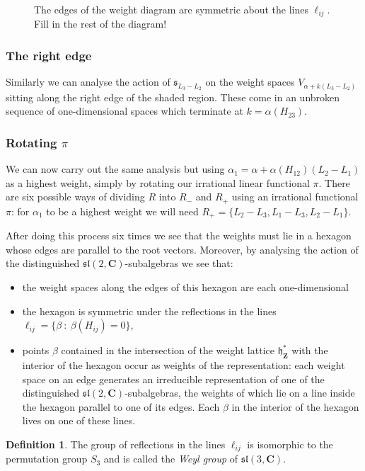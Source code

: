 \documentclass[12pt]{article}
\newcommand{\CC}{\mathbf{C}}
\newcommand{\ZZ}{\mathbf{Z}}
\theoremstyle{definition}
\newtheorem{dfn}[thm]{Definition}
\theoremstyle{check}
\theoremstyle{remark}
\theoremstyle{TheoremNum}
\begin{document}
\begin{figure}
\slhex
\caption{The edges of the weight diagram are symmetric about the lines $\ell_{ij}$. Fill in the rest of the diagram!}
\end{figure}

\subsubsection{The right edge}

Similarly we can analyse the action of $\mathfrak{s}_{L_3-L_2}$ on the weight spaces $V_{\alpha+k(L_3-L_2)}$ sitting along the right edge of the shaded region. These come in an unbroken sequence of one-dimensional spaces which terminate at $k=\alpha(H_{23})$.

\subsubsection{Rotating $\pi$}

We can now carry out the same analysis but using $\alpha_1=\alpha+\alpha(H_{12})(L_2-L_1)$ as a highest weight, simply by rotating our irrational linear functional $\pi$. There are six possible ways of dividing $R$ into $R_-$ and $R_+$ using an irrational functional $\pi$: for $\alpha_1$ to be a highest weight we will need $R_+=\{L_2-L_3,L_1-L_3,L_2-L_1\}$.

After doing this process six times we see that the weights must lie in a hexagon whose edges are parallel to the root vectors. Moreover, by analysing the action of the distinguished $\mathfrak{sl}(2,\CC)$-subalgebras we see that:
\begin{itemize}
\item the weight spaces along the edges of this hexagon are each one-dimensional
\item the hexagon is symmetric under the reflections in the lines $\ell_{ij}=\{\beta\ :\ \beta(H_{ij})=0\}$,
\item points $\beta$ contained in the intersection of the weight lattice $\mathfrak{h}^*_{\ZZ}$ with the interior of the hexagon occur as weights of the representation: each weight space on an edge generates an irreducible representation of one of the distinguished $\mathfrak{sl}(2,\CC)$-subalgebras, the weights of which lie on a line inside the hexagon parallel to one of its edges. Each $\beta$ in the interior of the hexagon lives on one of these lines.
\end{itemize}

\begin{dfn}
The group of reflections in the lines $\ell_{ij}$ is isomorphic to the permutation group $S_3$ and is called the {\em Weyl group} of $\mathfrak{sl}(3,\CC)$.
\end{dfn}
\end{document}
